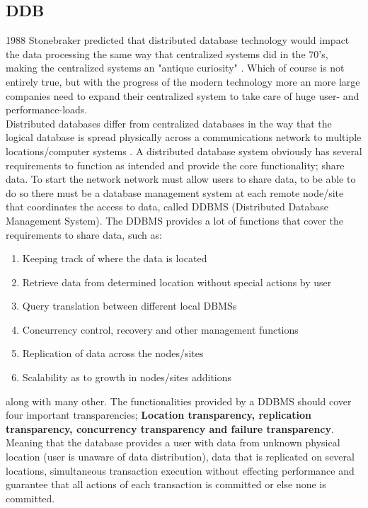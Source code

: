 \documentclass{cslthse-msc}
\begin{document}
\subsection{DDB}
1988 Stonebraker predicted that distributed database technology would impact the data processing the same way that centralized systems did in the 70's, making the centralized systems an "antique curiosity"  \cite{DDBMSvsCDBMS}. Which of course is not entirely true, but with the progress of the modern technology more an more large companies need to expand their centralized system to take care of huge user- and performance-loads.\\  
Distributed databases differ from centralized databases in the way that the logical database is spread physically across a communications network to multiple locations/computer systems \cite{DDBMS}. A distributed database system obviously has several requirements to function as intended and provide the core functionality; share data. To start the network network must allow users to share data, to be able to do so there must be a database management system at each remote node/site that coordinates the access to data, called DDBMS (Distributed Database Management System). The DDBMS provides a lot of functions that cover the requirements to share data, such as: \begin{enumerate}
\item Keeping track of where the data is located
\item Retrieve data from determined location without special actions by user
\item Query translation between different local DBMSs
\item Concurrency control, recovery and other management functions
\item Replication of data across the nodes/sites
\item Scalability as to growth in nodes/sites additions \begin{flushright}  \cite{functionsDDBMS}
\cite{datareplication}   \end{flushright}
\end{enumerate}      
along with many other. The functionalities provided by a DDBMS should cover four important transparencies; \textbf{Location transparency, replication transparency, concurrency transparency and failure transparency}. Meaning that the database provides a user with data from unknown physical location (user is unaware of data distribution), data that is replicated on several locations, simultaneous transaction execution without effecting performance and guarantee that all actions of each transaction is committed or else none is committed.\\\\
\end{document}
